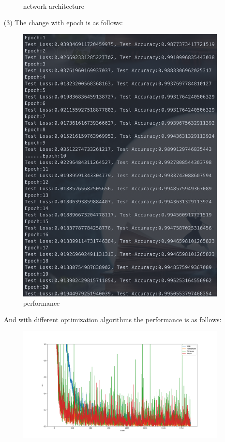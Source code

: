 \begin{solution}
\begin{enumerate}
\begin{figure}[H]
                \caption{network architecture}
            \end{figure}
        \item[(3)] The change with epoch is as follows:
            \begin{figure}[H]
                \centering
                \includegraphics[scale=0.30]{8.png}
                \caption{performance}
            \end{figure}
            And with different optimization algorithms the performance is as follows:
            \begin{figure}[H]
                \centering
                \includegraphics[scale=0.35]{4.png}

\end{figure}
\end{enumerate}
\end{solution}
